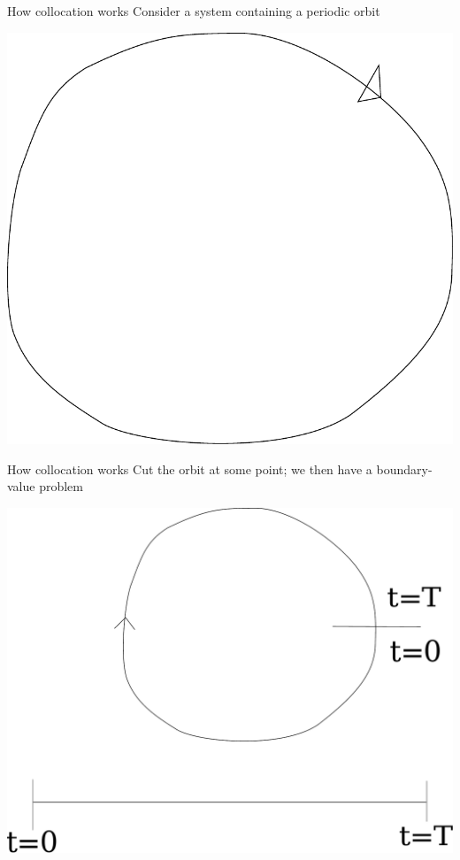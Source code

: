 \documentclass[presentation]{beamer}
\begin{document}
\begin{frame}[label={sec:orgbba6fba},plain]{How collocation works}
Consider a system containing a periodic orbit
\begin{center}
\includegraphics[width=.9\linewidth]{./1_orbit.pdf}
\end{center}
\end{frame}

\begin{frame}[label={sec:orgc55a5e7},plain]{How collocation works}
Cut the orbit at some point; we then have a boundary-value problem
\begin{center}
\includegraphics[width=.9\linewidth]{./2_bvp.pdf}
\end{center}
\end{frame}
\end{document}
